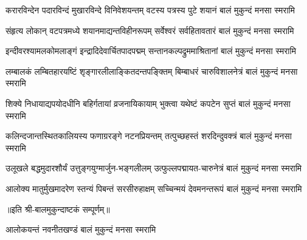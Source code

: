 

\twolineshloka
{करारविन्देन पदारविन्दं मुखारविन्दे विनिवेशयन्तम्‌}
{वटस्य पत्रस्य पुटे शयानं बालं मुकुन्दं मनसा स्मरामि}%

\twolineshloka
{संहृत्य लोकान् वटपत्रमध्ये शयानमाद्यन्तविहीनरूपम्}
{सर्वेश्वरं सर्वहितावतारं बालं मुकुन्दं मनसा स्मरामि}%

\twolineshloka
{इन्दीवरश्यामलकोमलाङ्गं इन्द्रादिदेवार्चितपादपद्मम्‌}
{सन्तानकल्पद्रुममाश्रितानां बालं मुकुन्दं मनसा स्मरामि}%

\twolineshloka
{लम्बालकं लम्बितहारयष्टिं शृङ्गारलीलाङ्कितदन्तपङ्क्तिम्}
{बिम्बाधरं चारुविशालनेत्रं बालं मुकुन्दं मनसा स्मरामि}%

\twolineshloka
{शिक्ये निधायाद्यपयोदधीनि बहिर्गतायां व्रजनायिकायाम्‌}
{भुक्त्वा यथेष्टं कपटेन सुप्तं बालं मुकुन्दं मनसा स्मरामि}%

\twolineshloka
{कलिन्दजान्तस्थितकालियस्य फणाग्ररङ्गे नटनप्रियन्तम्‌}
{तत्पुच्छहस्तं शरदिन्दुवक्त्रं बालं मुकुन्दं मनसा स्मरामि}%

\twolineshloka
{उलूखले बद्धमुदारशौर्यं उत्तुङ्गयुग्मार्जुन-भङ्गलीलम्‌}
{उत्फुल्लपद्मायत-चारुनेत्रं बालं मुकुन्दं मनसा स्मरामि}%

\twolineshloka
{आलोक्य मातुर्मुखमादरेण स्तन्यं पिबन्तं सरसीरुहाक्षम्‌}
{सच्चिन्मयं देवमनन्तरूपं बालं मुकुन्दं मनसा स्मरामि}%

॥इति श्री-बालमुकुन्दाष्टकं सम्पूर्णम्‌॥

{आलोकयन्तं नवनीतखण्डं बालं मुकुन्दं मनसा स्मरामि}%